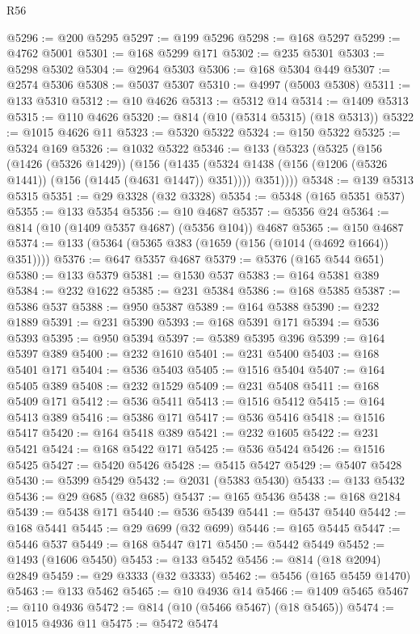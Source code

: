 \begin{lexlean}{R56}
\begin{coremodule}
@5296 := @200 @5295
@5297 := @199 @5296
@5298 := @168 @5297
@5299 := @4762 @5001
@5301 := @168 @5299 @171
@5302 := @235 @5301
@5303 := @5298 @5302
@5304 := @2964 @5303
@5306 := @168 @5304 @449
@5307 := @2574 @5306
@5308 := @5037 @5307
@5310 := @4997 (@5003 @5308)
@5311 := @133 @5310
@5312 := @10 @4626
@5313 := @5312 @14
@5314 := @1409 @5313
@5315 := @110 @4626
@5320 := @814 (@10 (@5314 @5315) (@18 @5313))
@5322 := @1015 @4626 @11
@5323 := @5320 @5322
@5324 := @150 @5322
@5325 := @5324 @169
@5326 := @1032 @5322
@5346 := @133
    (@5323
      (@5325
        (@156
          (@1426 (@5326 @1429))
          (@156
            (@1435 (@5324 @1438 (@156 (@1206 (@5326 @1441)) (@156 (@1445 (@4631 @1447)) @351))))
            @351))))
@5348 := @139 @5313 @5315
@5351 := @29 @3328 (@32 @3328)
@5354 := @5348 (@165 @5351 @537)
@5355 := @133 @5354
@5356 := @10 @4687
@5357 := @5356 @24
@5364 := @814 (@10 (@1409 @5357 @4687) (@5356 @104)) @4687
@5365 := @150 @4687
@5374 := @133 (@5364 (@5365 @383 (@1659 (@156 (@1014 (@4692 @1664)) @351))))
@5376 := @647 @5357 @4687
@5379 := @5376 (@165 @544 @651)
@5380 := @133 @5379
@5381 := @1530 @537
@5383 := @164 @5381 @389
@5384 := @232 @1622
@5385 := @231 @5384
@5386 := @168 @5385
@5387 := @5386 @537
@5388 := @950 @5387
@5389 := @164 @5388
@5390 := @232 @1889
@5391 := @231 @5390
@5393 := @168 @5391 @171
@5394 := @536 @5393
@5395 := @950 @5394
@5397 := @5389 @5395 @396
@5399 := @164 @5397 @389
@5400 := @232 @1610
@5401 := @231 @5400
@5403 := @168 @5401 @171
@5404 := @536 @5403
@5405 := @1516 @5404
@5407 := @164 @5405 @389
@5408 := @232 @1529
@5409 := @231 @5408
@5411 := @168 @5409 @171
@5412 := @536 @5411
@5413 := @1516 @5412
@5415 := @164 @5413 @389
@5416 := @5386 @171
@5417 := @536 @5416
@5418 := @1516 @5417
@5420 := @164 @5418 @389
@5421 := @232 @1605
@5422 := @231 @5421
@5424 := @168 @5422 @171
@5425 := @536 @5424
@5426 := @1516 @5425
@5427 := @5420 @5426
@5428 := @5415 @5427
@5429 := @5407 @5428
@5430 := @5399 @5429
@5432 := @2031 (@5383 @5430)
@5433 := @133 @5432
@5436 := @29 @685 (@32 @685)
@5437 := @165 @5436
@5438 := @168 @2184
@5439 := @5438 @171
@5440 := @536 @5439
@5441 := @5437 @5440
@5442 := @168 @5441
@5445 := @29 @699 (@32 @699)
@5446 := @165 @5445
@5447 := @5446 @537
@5449 := @168 @5447 @171
@5450 := @5442 @5449
@5452 := @1493 (@1606 @5450)
@5453 := @133 @5452
@5456 := @814 (@18 @2094) @2849
@5459 := @29 @3333 (@32 @3333)
@5462 := @5456 (@165 @5459 @1470)
@5463 := @133 @5462
@5465 := @10 @4936 @14
@5466 := @1409 @5465
@5467 := @110 @4936
@5472 := @814 (@10 (@5466 @5467) (@18 @5465))
@5474 := @1015 @4936 @11
@5475 := @5472 @5474

\end{coremodule}
\end{lexlean}
